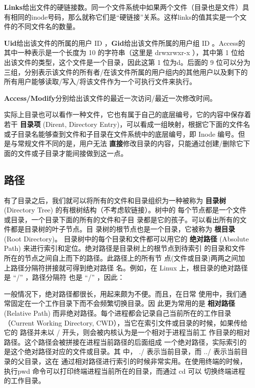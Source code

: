 \textbf{Links}给出文件的硬链接数。同一个文件系统中如果两个文件（目录也是文件）具有相同的inode号码，那么就称它们是“硬链接”关系。这样links的值其实是一个文件的不同文件名的数量。

\textbf{Uid}给出该文件的所属的用户 ID ，\textbf{Gid}给出该文件所属的用户组 ID 。Access的其中一种表示是一个长度为 10 的字符串（这里是 drwxrwxr-x ），其中第 1 位给出该文件的类型，这个文件是一个目录，因此这第 1 位为d。后面的 9 位可以分为三组，分别表示该文件的所有者/在该文件所属的用户组内的其他用户以及剩下的所有用户能够读取/写入/将该文件作为一个可执行文件来执行。

\textbf{Access/Modify}分别给出该文件的最近一次访问/最近一次修改时间。

实际上目录也可以看作一种文件，它也有属于自己的底层编号，它的内容中保存着若干 \textbf{目录项} (Dirent, Directory Entry)，可以看成一组映射，根据它下面的文件名或子目录名能够查到文件和子目录在文件系统中的底层编号，即 Inode 编号。但是与常规文件不同的是，用户无法
\textbf{直接}修改目录的内容，只能通过创建/删除它下面的文件或子目录才能间接做到这一点。

\subsection{路径}
有了目录之后，我们就可以将所有的文件和目录组织为一种被称为
\textbf{目录树} (Directory Tree) 的有根树结构（不考虑软链接）。树中的
每个节点都是一个文件或目录，一个目录下面的所有的文件和子目
录都是它的孩子。可以看出所有的文件都是目录树的叶子节点。目
录树的根节点也是一个目录，它被称为\textbf{ 根目录} (Root Directory)。
目录树中的每个目录和文件都可以用它的\textbf{ 绝对路径 }(Absolute
Path) 来进行索引和定位。绝对路径是目录树上的根节点到待索引
的目录和文件所在的节点之间自上而下的路径。此路径上的所有节
点(文件或目录)两两之间加上路径分隔符拼接就可得到绝对路径
名。例如，在 Linux 上，根目录的绝对路径是 “/” ，路径分隔符
也是 “/” ，因此：

一般情况下，绝对路径都很长，用起来颇为不便。而且，在日常
使用中，我们通常固定在一个工作目录下而不会频繁切换目录。因
此更为常用的是 \textbf{相对路径} (Relative Path) 而非绝对路径。每个进程都会记录自己当前所在的工作目录（Current Working
Directory, CWD），当它在索引文件或目录的时候，如果传给它的
路径并未以 / 开头，则会被内核认为是一个相对于进程当前工
作目录的相对路径。这个路径会被拼接在进程当前路径的后面组成
一个绝对路径，实际索引的是这个绝对路径对应的文件或目录。其
中， ./ 表示当前目录，而 ../ 表示当前目录的父目录，这在
通过相对路径进行索引的时候非常实用。在使用终端的时候，执行pwd 命令可以打印终端进程当前所在的目录，而通过 cd 可以
切换终端进程的工作目录。


